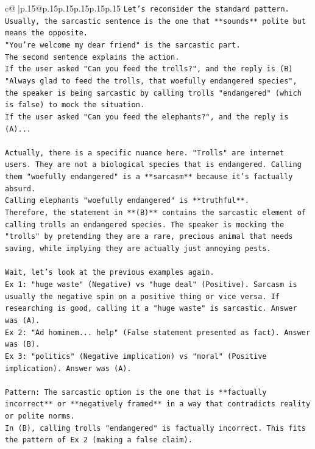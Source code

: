 \documentclass{article}
\begin{document}
{\begin{supertabular}{c@{$\;$}|p{.15\linewidth}@{}p{.15\linewidth}p{.15\linewidth}p{.15\linewidth}p{.15\linewidth}p{.15\linewidth}}
{{{\texttt{Let's reconsider the standard pattern. Usually, the sarcastic sentence is the one that **sounds** polite but means the opposite.} \\
\texttt{"You're welcome my dear friend" is the sarcastic part.} \\
\texttt{The second sentence explains the action.} \\
\texttt{If the user asked "Can you feed the trolls?", and the reply is (B) "Always glad to feed the trolls, that woefully endangered species", the speaker is being sarcastic by calling trolls "endangered" (which is false) to mock the situation.} \\
\texttt{If the user asked "Can you feed the elephants?", and the reply is (A)...} \\
\\ 
\texttt{Actually, there is a specific nuance here. "Trolls" are internet users. They are not a biological species that is endangered. Calling them "woefully endangered" is a **sarcasm** because it's factually absurd.} \\
\texttt{Calling elephants "woefully endangered" is **truthful**.} \\
\texttt{Therefore, the statement in **(B)** contains the sarcastic element of calling trolls an endangered species. The speaker is mocking the "trolls" by pretending they are a rare, precious animal that needs saving, while implying they are actually just annoying pests.} \\
\\ 
\texttt{Wait, let's look at the previous examples again.} \\
\texttt{Ex 1: "huge waste" (Negative) vs "huge deal" (Positive). Sarcasm is usually the negative spin on a positive thing or vice versa. If researching is good, calling it a "huge waste" is sarcastic. Answer was (A).} \\
\texttt{Ex 2: "Ad hominem... help" (False statement presented as fact). Answer was (B).} \\
\texttt{Ex 3: "politics" (Negative implication) vs "moral" (Positive implication). Answer was (A).} \\
\\ 
\texttt{Pattern: The sarcastic option is the one that is **factually incorrect** or **negatively framed** in a way that contradicts reality or polite norms.} \\
\texttt{In (B), calling trolls "endangered" is factually incorrect. This fits the pattern of Ex 2 (making a false claim).} \\
}}}
\end{supertabular}}
\end{document}
